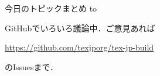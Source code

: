 \documentclass[a5paper,dvipdfmx,14pt]{beamer}
\begin{document}
\begin{frame}[t]{今日のトピックまとめ}{}
  \leavevmode\hbox to
  \par\vskip-105pt
  \pause
\begin{tcolorbox}[colframe=red,colback=white!90!red]\small
  GitHubでいろいろ議論中．ご意見あれば\par
    \url{https://github.com/texjporg/tex-jp-build}\par
  のIssuesまで．
\end{tcolorbox}
\end{frame}
\end{document}
